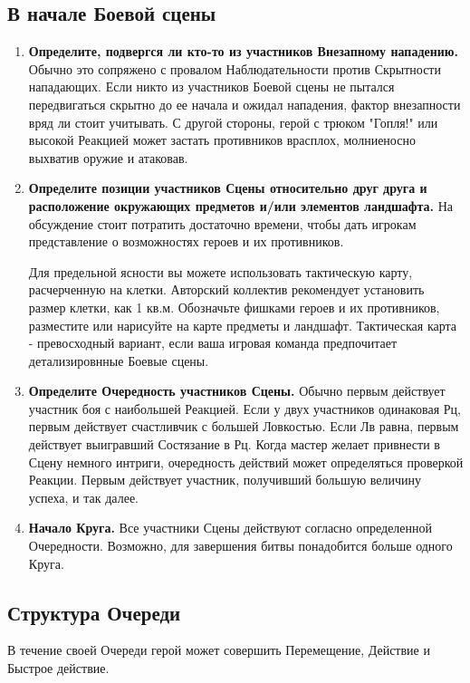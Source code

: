 \subsection{В начале Боевой сцены}
\begin{enumerate}
  \item \textbf{Определите, подвергся ли кто-то из участников Внезапному нападению.} Обычно это сопряжено с провалом Наблюдательности против Скрытности нападающих. Если никто из участников Боевой сцены не пытался передвигаться скрытно до ее начала и ожидал нападения, фактор внезапности вряд ли стоит учитывать. С другой стороны, герой с трюком "Гопля!" или высокой Реакцией может застать противников врасплох, молниеносно выхватив оружие и атаковав.
  \item \textbf{Определите позиции участников Сцены относительно друг друга и расположение окружающих предметов и/или элементов ландшафта.} На обсуждение стоит потратить достаточно времени, чтобы дать игрокам представление о возможностях героев и их противников. 
    \begin{tcolorbox}
      Для предельной ясности вы можете использовать тактическую карту, расчерченную на клетки. Авторский коллектив рекомендует установить размер клетки, как 1 кв.м. Обозначьте фишками героев и их противников, разместите или нарисуйте на карте предметы и ландшафт. Тактическая карта - превосходный вариант, если ваша игровая команда предпочитает детализировнные Боевые сцены.
    \end{tcolorbox}
  \item \textbf{Определите Очередность участников Сцены.} Обычно первым действует участник боя с наибольшей Реакцией. Если у двух участников одинаковая Рц, первым действует счастливчик с большей Ловкостью. Если Лв равна, первым действует выигравший Состязание в Рц. 
    \newline Когда мастер желает привнести в Сцену немного интриги, очередность действий может определяться проверкой Реакции. Первым действует участник, получивший большую величину успеха, и так далее.
  \item \textbf{Начало Круга.} Все участники Сцены действуют согласно определенной Очередности. Возможно, для завершения битвы понадобится больше одного Круга.
\end{enumerate}

\subsection{Структура Очереди}
В течение своей Очереди герой может совершить Перемещение, Действие и Быстрое действие. 
